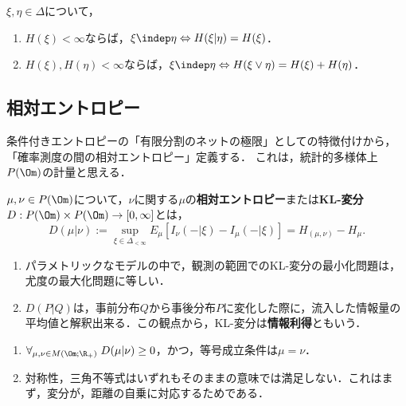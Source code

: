 \documentclass[uplatex,dvipdfmx]{jsreport}
\begin{document}
\begin{proposition}[独立性の特徴付け]\label{prop-independence-and-conditional-entropy}
    $\xi,\eta\in\Delta$について，
    \begin{enumerate}
        \item $H(\xi)<\infty$ならば，$\xi\indep\eta\Leftrightarrow H(\xi|\eta)=H(\xi)$．
        \item $H(\xi),H(\eta)<\infty$ならば，$\xi\indep\eta\Leftrightarrow H(\xi\lor\eta)=H(\xi)+H(\eta)$．
    \end{enumerate}
\end{proposition}

\subsection{相対エントロピー}

\begin{tcolorbox}[colframe=ForestGreen, colback=ForestGreen!10!white,breakable,colbacktitle=ForestGreen!40!white,coltitle=black,fonttitle=\bfseries\sffamily,
title=]
    条件付きエントロピーの「有限分割のネットの極限」としての特徴付けから，「確率測度の間の相対エントロピー」定義する．
    これは，統計的多様体上$P(\Om)$の計量と思える．
\end{tcolorbox}

\begin{definition}
    $\mu,\nu\in P(\Om)$について，$\nu$に関する$\mu$の\textbf{相対エントロピー}または\textbf{KL-変分}$D:P(\Om)\times P(\Om)\to[0,\infty]$とは，
    \[D(\mu|\nu):=\sup_{\xi\in\Delta_{<\infty}}E_\mu[I_\nu(-|\xi)-I_\mu(-|\xi)]=H_{(\mu,\nu)}-H_\mu.\]
\end{definition}
\begin{remarks}\mbox{}
    \begin{enumerate}
        \item パラメトリックなモデルの中で，観測の範囲でのKL-変分の最小化問題は，尤度の最大化問題に等しい．
        \item $D(P|Q)$は，事前分布$Q$から事後分布$P$に変化した際に，流入した情報量の平均値と解釈出来る．この観点から，KL-変分は\textbf{情報利得}ともいう．
    \end{enumerate}
\end{remarks}

\begin{proposition}\mbox{}
    \begin{enumerate}
        \item $\forall_{\mu,\nu\in M(\Om;\R_+)}\;D(\mu|\nu)\ge0$，かつ，等号成立条件は$\mu=\nu$．
        \item 対称性，三角不等式はいずれもそのままの意味では満足しない．これはまず，変分が，距離の自乗に対応するためである．
    \end{enumerate}
\end{proposition}
\end{document}
